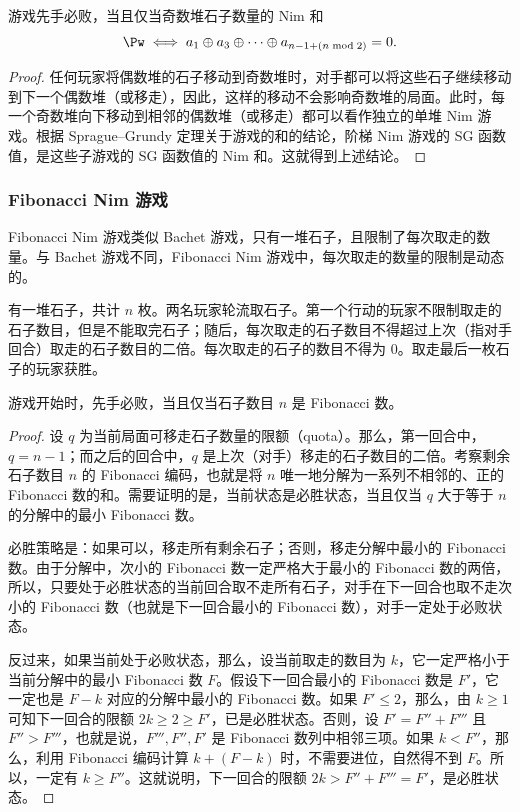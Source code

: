 \begin{theorem}
	游戏先手必败，当且仅当奇数堆石子数量的 Nim 和
	$$\Pw \iff a_1\oplus a_3\oplus\cdots\oplus a_{n-1+(n\bmod 2)}=0.$$
\end{theorem}

\begin{proof}
	任何玩家将偶数堆的石子移动到奇数堆时，对手都可以将这些石子继续移动到下一个偶数堆（或移走），因此，这样的移动不会影响奇数堆的局面。此时，每一个奇数堆向下移动到相邻的偶数堆（或移走）都可以看作独立的单堆 Nim 游戏。根据 Sprague--Grundy 定理关于游戏的和的结论，阶梯 Nim 游戏的 SG 函数值，是这些子游戏的 SG 函数值的 Nim 和。这就得到上述结论。
\end{proof}

\subsubsection{Fibonacci Nim 游戏}

Fibonacci Nim 游戏类似 Bachet 游戏，只有一堆石子，且限制了每次取走的数量。与 Bachet 游戏不同，Fibonacci Nim 游戏中，每次取走的数量的限制是动态的。

\begin{game}
	有一堆石子，共计 $n$ 枚。两名玩家轮流取石子。第一个行动的玩家不限制取走的石子数目，但是不能取完石子；随后，每次取走的石子数目不得超过上次（指对手回合）取走的石子数目的二倍。每次取走的石子的数目不得为 $0$。取走最后一枚石子的玩家获胜。
\end{game}

\begin{theorem}
	游戏开始时，先手必败，当且仅当石子数目 $n$ 是 Fibonacci 数。
\end{theorem}

\begin{proof}
	设 $q$ 为当前局面可移走石子数量的限额（quota）。那么，第一回合中，$q=n-1$；而之后的回合中，$q$ 是上次（对手）移走的石子数目的二倍。考察剩余石子数目 $n$ 的 Fibonacci 编码，也就是将 $n$ 唯一地分解为一系列不相邻的、正的 Fibonacci 数的和。需要证明的是，当前状态是必胜状态，当且仅当 $q$ 大于等于 $n$ 的分解中的最小 Fibonacci 数。
	
	必胜策略是：如果可以，移走所有剩余石子；否则，移走分解中最小的 Fibonacci 数。由于分解中，次小的 Fibonacci 数一定严格大于最小的 Fibonacci 数的两倍，所以，只要处于必胜状态的当前回合取不走所有石子，对手在下一回合也取不走次小的 Fibonacci 数（也就是下一回合最小的 Fibonacci 数），对手一定处于必败状态。
	
	反过来，如果当前处于必败状态，那么，设当前取走的数目为 $k$，它一定严格小于当前分解中的最小 Fibonacci 数 $F$。假设下一回合最小的 Fibonacci 数是 $F'$，它一定也是 $F - k$ 对应的分解中最小的 Fibonacci 数。如果 $F'\le 2$，那么，由 $k\ge 1$ 可知下一回合的限额 $2k\ge 2\ge F'$，已是必胜状态。否则，设 $F'=F''+F'''$ 且 $F''>F'''$，也就是说，$F''',F'',F'$ 是 Fibonacci 数列中相邻三项。如果 $k<F''$，那么，利用 Fibonacci 编码计算 $k + (F-k)$ 时，不需要进位，自然得不到 $F$。所以，一定有 $k\ge F''$。这就说明，下一回合的限额 $2k>F''+F'''=F'$，是必胜状态。
\end{proof}

